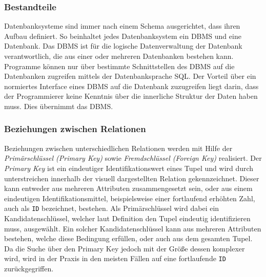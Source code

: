 \subsubsection{Bestandteile}
\label{ssec:Datenbanken_Bestandteile}
Datenbanksysteme sind immer nach einem Schema ausgerichtet, dass ihren Aufbau definiert.
So beinhaltet jedes Datenbanksystem ein \ac{DBMS} und eine Datenbank.
Das \ac{DBMS} ist für die logische Datenverwaltung der Datenbank verantwortlich, die aus einer oder mehreren Datenbanken bestehen kann. 
Programme können nur über bestimmte Schnittstellen des \ac{DBMS} auf die Datenbanken zugreifen \zb mittels der Datenbanksprache \ac{SQL}.\autocite{Book_DB_1}\autocite{Book_DB_2}
Der Vorteil über ein normiertes Interface eines \ac{DBMS} auf die Datenbank zuzugreifen liegt darin, dass der Programmierer keine Kenntnis über die innerliche Struktur der Daten haben muss.
Dies übernimmt das \ac{DBMS}.\autocite[vgl. S.4][]{Schicker2017DatenbankenSQL}


\subsubsection{Beziehungen zwischen Relationen}
Beziehungen zwischen unterschiedlichen Relationen werden mit Hilfe der \emph{Primärschlüssel (Primary Key)} sowie \emph{Fremdschlüssel (Foreign Key)} realisiert.
Der \emph{Primary Key} ist ein eindeutiger Identifikationswert eines Tupel und wird durch unterstreichen innerhalb der visuell dargestellten Relation gekennzeichnet.
Dieser kann entweder aus mehreren Attributen zusammengesetzt sein, oder aus einem eindeutigen Identifikationsmittel, beispielsweise einer fortlaufend erhöhten Zahl, auch als \texttt{ID} bezeichnet, bestehen.
Als Primärschlüssel wird dabei ein Kandidatenschlüssel, welcher laut Definition den Tupel eindeutig identifizieren muss, ausgewählt.
Ein solcher Kandidatenschlüssel kann aus mehreren Attributen bestehen, welche diese Bedingung erfüllen, oder auch aus dem gesamten Tupel.
Da die Suche über den Primary Key jedoch mit der Größe dessen komplexer wird, wird in der Praxis in den meisten Fällen auf eine fortlaufende \texttt{ID} zurückgegriffen.\autocite{Book_DB_2}


